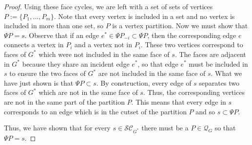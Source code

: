 \documentclass{article}
\begin{document}
\begin{proof}
    Using these face cycles, we are left with a set of sets of vertices $P:=\{P_1,...,P_m\}$. Note that every vertex is included in a set and no vertex is included in more than one set, so $P$ is a vertex partition. Now we must show that $\Psi P=s$. Observe that if an edge $e^*\in \Psi P_{-i}\subset \Psi P$, then the corresponding edge $e$ connects a vertex in $P_i$ and a vertex not in $P_i$. These two vertices correspond to faces of $G^*$ which were not included in the same face of $s$. The faces are adjacent in $G^*$ because they share an incident edge $e^*$, so that edge $e^*$ must be included in $s$ to ensure the two faces of $G^*$ are not included in the same face of $s$. What we have just shown is that $\Psi P\subset s$. By construction, every edge of $s$ separates two faces of $G^*$ which are not in the same face of $s$. Thus, the corresponding vertices are not in the same part of the partition $P$. This means that every edge in $s$ corresponds to an edge which is in the cutset of the partition $P$ and so $s\subset \Psi P$.
    
     Thus, we have shown that for every $s\in \mathcal{SC}_{G^*}$ there must be a $P\in \mathcal{Q}_G$ so that $\Psi P=s$.
\end{proof}
\end{document}
